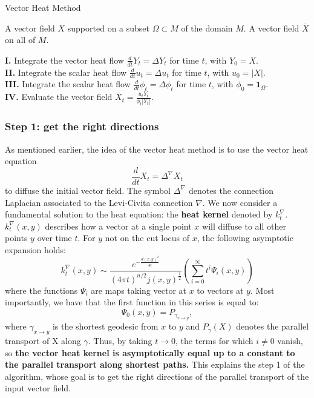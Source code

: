 \documentclass[sigconf]{acmart}
\begin{document}
\begin{algorithm}
\caption{Vector Heat Method} \label{algo1}
\begin{algorithmic}
\Require A vector field $X$ supported on a subset $\Omega \subset M$ of the domain $M$.
\Ensure A vector field $\overline{X}$ on all of $M$.

\noindent \textbf{I.} Integrate the vector heat flow $\frac{d}{dt} Y_t = \Delta Y_t$ for time $t$, with $Y_0 = X$. \\

\textbf{II.} Integrate the scalar heat flow $\frac{d}{dt} u_t = \Delta u_t$ for time $t$, with $u_0 = |X|$. \\

\textbf{III.} Integrate the scalar heat flow $\frac{d}{dt} \phi_t = \Delta \phi_t$ for time $t$, with $\phi_0 = \mathbf{1}_{\Omega}$. \\

\textbf{IV.} Evaluate the vector field $\overline{X}_t = \frac{u_t Y_t}{\phi_t |Y_t|}$.
\end{algorithmic}
\end{algorithm}

\subsubsection{Step 1: get the right directions}
As mentioned earlier, the idea of the vector heat method is to use the vector heat equation 
\begin{equation} \label{eq:vector-heat}
  \frac{d}{dt} X_t = \Delta^\nabla X_t
  \end{equation}
to diffuse the initial vector field. The symbol $\Delta^\nabla$ denotes the connection Laplacian associated to the Levi-Civita connection $\nabla$. 
We now consider a fundamental solution to the heat equation: the \textbf{heat kernel} denoted by $k_t^\nabla$. $k_t^\nabla(x,y)$ describes how 
a vector at a single point $x$ will diffuse to all other points $y$ over time $t$. For $y$ not on the cut locus of $x$, the following asymptotic
expansion holds:
\begin{equation} \label{eq:asymptotic_expansion}
  k_t^\nabla(x, y) \sim \frac{e^{-\frac{d(x, y)^2}{4t}}}{(4 \pi t)^{n/2} j(x, y)^\frac{1}{2}} 
\left( \sum_{i=0}^{\infty} t^i \Psi_i(x, y) \right)
  \end{equation}
where the functions $\Psi_i$ are maps taking vector at $x$ to vectors at $y$. Most importantly, we have that the first function in this series 
is equal to:
$$\Psi_0(x,y) = P_{\gamma_{x\rightarrow y}}, $$ where $\gamma_{x \rightarrow y}$ is the shortest geodesic from $x$ to $y$ and $P_\gamma(X)$
denotes the parallel transport of X along $\gamma$. Thus, by taking $t\rightarrow 0$, the terms for which $i\neq 0$ vanish, so \textbf{the vector heat 
kernel is asymptotically equal up to a constant to the parallel transport along shortest paths.} This explains the step 1 of the algorithm, whose goal 
is to get the right directions of the parallel transport of the input vector field.
\end{document}
